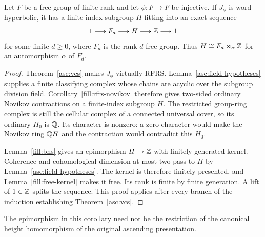 \begin{corollary}\label{cor:ascending-finite-rank}
Let $F$ be a free group of finite rank and let $\phi:F\to F$ be injective.
If $J_\phi$ is word-hyperbolic, it has a finite-index subgroup $H$ fitting
into an exact sequence
\[
 1\longrightarrow F_d\longrightarrow H\longrightarrow\mathbb Z
 \longrightarrow1
\]
for some finite $d\geq0$, where $F_d$ is the rank-$d$ free group.
Thus $H\cong F_d\rtimes_\alpha\mathbb Z$ for an automorphism $\alpha$ of $F_d$.
\end{corollary}

\begin{proof}
Theorem~\ref{asc:vcs} makes $J_\phi$ virtually RFRS.
Lemma~\ref{asc:field-hypotheses} supplies a finite classifying complex
whose chains are acyclic over the subgroup division field.
Corollary~\ref{fill:rfrs-novikov} therefore gives two-sided ordinary
Novikov contractions on a finite-index subgroup $H$. The restricted
group-ring complex is still the cellular complex of a connected
universal cover, so its ordinary $H_0$ is $\mathbb Q$. Its character is
nonzero: a zero character would make the Novikov ring $\mathbb Q H$ and the
contraction would contradict this $H_0$.

Lemma~\ref{fill:bns} gives an epimorphism $H\to\mathbb Z$ with finitely
generated kernel. Coherence and cohomological dimension at most two
pass to $H$ by Lemma~\ref{asc:field-hypotheses}. The kernel is therefore
finitely presented, and Lemma~\ref{fill:free-kernel} makes it free.
Its rank is finite by finite generation. A lift of $1\in\mathbb Z$ splits
the sequence. This proof applies after every branch of the induction
establishing Theorem~\ref{asc:vcs}.
\end{proof}

The epimorphism in this corollary need not be the restriction of the
canonical height homomorphism of the original ascending presentation.
